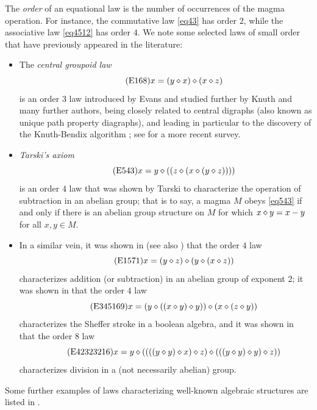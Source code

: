 The \emph{order} of an equational law is the number of occurrences of the magma operation. For instance, the commutative law \eqref{eq43} has order $2$, while the associative law \eqref{eq4512} has order $4$. We note some selected laws of small order that have previously appeared in the literature:
\begin{itemize}
\item The \emph{central groupoid law}
\begin{equation}\label{eq168}\tag{E168}
x = (y \diamond x) \diamond (x \diamond z)
\end{equation}
is an order $3$ law introduced by Evans \cite{evans} and studied further by Knuth \cite{knuth} and many further authors, being closely related to central digraphs (also known as unique path property diagraphs), and leading in particular to the discovery of the Knuth-Bendix algorithm \cite{knuth-bendix}; see \cite{klt} for a more recent survey.
\item \emph{Tarski's axiom}
\begin{equation}\label{eq543}\tag{E543}
    x = y \diamond ( (z \diamond (x \diamond (y \diamond z))))
\end{equation}
is an order $4$ law that was shown by Tarski \cite{Tarski1938} to characterize the operation of subtraction in an abelian group; that is to say, a magma $M$ obeys \eqref{eq543} if and only if there is an abelian group structure on $M$ for which $x \diamond y = x-y$ for all $x,y \in M$.
\item In a similar vein, it was shown in \cite{mendelsohn-padmanabhan} (see also \cite{meredith-prior}) that the order $4$ law
\begin{equation}\label{eq1571}\tag{E1571}
    x = (y \diamond z) \diamond (y \diamond (x \diamond z))
\end{equation}
characterizes addition (or subtraction) in an abelian group of exponent $2$; it was shown in \cite{mccune_et_al} that the order $4$ law
\begin{equation}\label{eq345169}\tag{E345169}
    x = (y \diamond ((x \diamond y) \diamond y)) \diamond (x \diamond (z \diamond y))
\end{equation}
characterizes the Sheffer stroke in a boolean algebra, and it was shown in \cite{higman-neumann} that the order $8$ law
\begin{equation}\label{eq42323216}\tag{E42323216}
x = y \diamond ((((y \diamond y) \diamond x) \diamond z) \diamond (((y \diamond y) \diamond y) \diamond z))
\end{equation}
characterizes division in a (not necessarily abelian) group.
\end{itemize}
Some further examples of laws characterizing well-known algebraic structures are listed in \cite{mccune-survey}.

